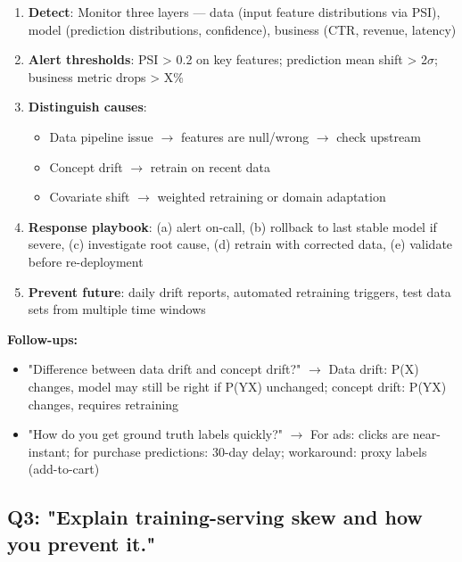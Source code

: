 \documentclass[11pt]{article}
\providecommand{\tightlist}{\setlength{\itemsep}{1pt}\setlength{\parskip}{0pt}}
\begin{document}
\begin{enumerate}
\def\labelenumi{\arabic{enumi}.}
\tightlist
\item
  \textbf{Detect}: Monitor three layers --- data (input feature distributions via PSI), model (prediction distributions, confidence), business (CTR, revenue, latency)
\item
  \textbf{Alert thresholds}: PSI \textgreater{} 0.2 on key features; prediction mean shift \textgreater{} 2\(\sigma\); business metric drops \textgreater{} X\%
\item
  \textbf{Distinguish causes}:

  \begin{itemize}
  \tightlist
  \item
    Data pipeline issue \(\rightarrow\) features are null/wrong \(\rightarrow\) check upstream
  \item
    Concept drift \(\rightarrow\) retrain on recent data
  \item
    Covariate shift \(\rightarrow\) weighted retraining or domain adaptation
  \end{itemize}
\item
  \textbf{Response playbook}: (a) alert on-call, (b) rollback to last stable model if severe, (c) investigate root cause, (d) retrain with corrected data, (e) validate before re-deployment
\item
  \textbf{Prevent future}: daily drift reports, automated retraining triggers, test data sets from multiple time windows
\end{enumerate}

\textbf{Follow-ups:}

\begin{itemize}
\tightlist
\item
  "Difference between data drift and concept drift?" \(\rightarrow\) Data drift: P(X) changes, model may still be right if P(Y\textbar X) unchanged; concept drift: P(Y\textbar X) changes, requires retraining
\item
  "How do you get ground truth labels quickly?" \(\rightarrow\) For ads: clicks are near-instant; for purchase predictions: 30-day delay; workaround: proxy labels (add-to-cart)
\end{itemize}

\subsection{Q3: "Explain training-serving skew and how you prevent it."}\label{q3-explain-training-serving-skew-and-how-you-prevent-it}
\end{document}
